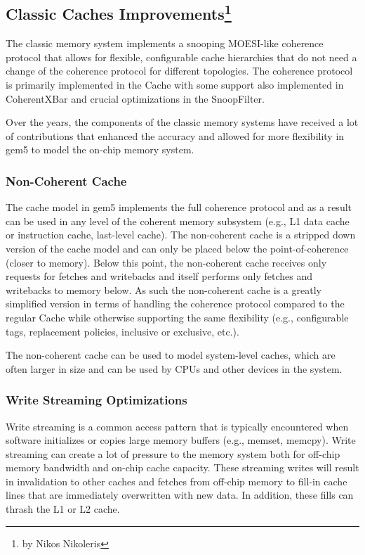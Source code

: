 \subsection[Classic Caches Improvements]{Classic Caches Improvements\footnote{by Nikos Nikoleris}}

The classic memory system implements a snooping MOESI-like coherence protocol that allows for flexible, configurable cache hierarchies that do not need a change of the coherence protocol for different topologies.
The coherence protocol is primarily implemented in the Cache with some support also implemented in CoherentXBar and crucial optimizations in the SnoopFilter.

Over the years, the components of the classic memory systems have received a lot of contributions that enhanced the accuracy and allowed for more flexibility in gem5 to model the on-chip memory system.

\subsubsection[Non-Coherent Cache]{Non-Coherent Cache}
The cache model in gem5 implements the full coherence protocol and as a result can be used in any level of the coherent memory subsystem (e.g., L1 data cache or instruction cache, last-level cache).
The non-coherent cache is a stripped down version of the cache model and can only be placed below the point-of-coherence (closer to memory).
Below this point, the non-coherent cache receives only requests for fetches and writebacks and itself performs only fetches and writebacks to memory below.
As such the non-coherent cache is a greatly simplified version in terms of handling the coherence protocol compared to the regular Cache while otherwise supporting the same flexibility (e.g., configurable tags, replacement policies, inclusive or exclusive, etc.).

The non-coherent cache can be used to model system-level caches, which are often larger in size and can be used by CPUs and other devices in the system.

\subsubsection[Write Streaming Optimizations]{Write Streaming Optimizations}

Write streaming is a common access pattern that is typically encountered when software initializes or copies large memory buffers (e.g., memset, memcpy).
Write streaming can create a lot of pressure to the memory system both for off-chip memory bandwidth and on-chip cache capacity.
These streaming writes will result in invalidation to other caches and fetches from off-chip memory to fill-in cache lines that are immediately overwritten with new data.
In addition, these fills can thrash the L1 or L2 cache.

